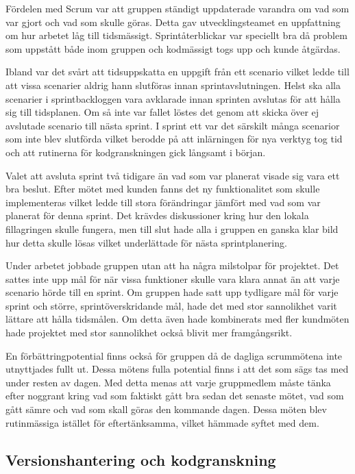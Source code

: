 Fördelen med Scrum var att gruppen ständigt uppdaterade varandra om vad som var
gjort och vad som skulle göras. Detta gav utvecklingsteamet en uppfattning om
hur arbetet låg till tidsmässigt. Sprintåterblickar var speciellt bra då
problem som uppstått både inom gruppen och kodmässigt togs upp och kunde
åtgärdas.

Ibland var det svårt att tidsuppskatta en uppgift från ett scenario vilket
ledde till att vissa scenarier aldrig hann slutföras innan sprintavslutningen.
Helst ska alla scenarier i sprintbackloggen vara avklarade innan sprinten
avslutas för att hålla sig till tidsplanen. Om så inte var fallet löstes det
genom att skicka över ej avslutade scenario till nästa sprint. I sprint ett var
det särskilt många scenarior som inte blev slutförda vilket berodde på att
inlärningen för nya verktyg tog tid och att rutinerna för kodgranskningen gick
långsamt i början.

Valet att avsluta sprint två tidigare än vad som var planerat visade sig vara
ett bra beslut. Efter mötet med kunden fanns det ny funktionalitet som skulle
implementeras vilket ledde till stora förändringar jämfört med vad som var
planerat för denna sprint. Det krävdes diskussioner kring hur den lokala
fillagringen skulle fungera, men till slut hade alla i gruppen en ganska klar
bild hur detta skulle lösas vilket underlättade för nästa sprintplanering.

Under arbetet jobbade gruppen utan att ha några milstolpar för projektet. Det
sattes inte upp mål för när vissa funktioner skulle vara klara annat än att
varje scenario hörde till en sprint. Om gruppen hade satt upp tydligare mål för
varje sprint och större, sprintöverskridande mål, hade det med stor sannolikhet
varit lättare att hålla tidsmålen. Om detta även hade kombinerats med fler
kundmöten hade projektet med stor sannolikhet också blivit mer framgångsrikt.

En förbättringpotential finns också för gruppen då de dagliga scrummötena inte
utnyttjades fullt ut. Dessa mötens fulla potential finns i att det som sägs tas
med under resten av dagen. Med detta menas att varje gruppmedlem måste tänka
efter noggrant kring vad som faktiskt gått bra sedan det senaste mötet, vad som
gått sämre och vad som skall göras den kommande dagen. Dessa möten blev
rutinmässiga istället för eftertänksamma, vilket hämmade syftet med dem.

\subsection{Versionshantering och kodgranskning}

